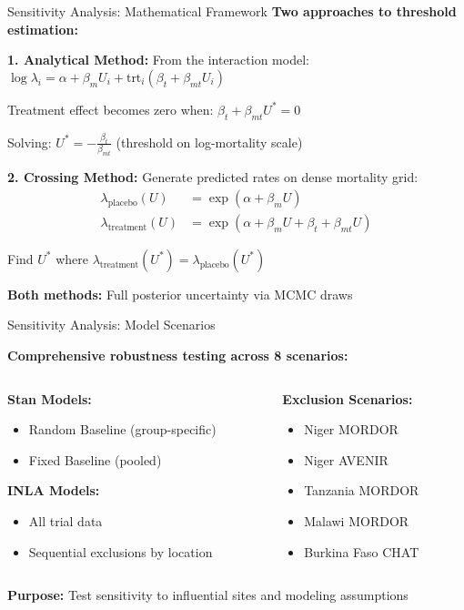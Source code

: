 \documentclass[aspectratio=169]{beamer}\usepackage[]{graphicx}\usepackage[dvipsnames]{xcolor}
\begin{document}
\begin{frame}{Sensitivity Analysis: Mathematical Framework}
\textbf{Two approaches to threshold estimation:}

\vspace{0.3cm}
\textbf{1. Analytical Method:}
From the interaction model: $\log \lambda_i = \alpha + \beta_m U_i + \text{trt}_i(\beta_t + \beta_{mt} U_i)$

Treatment effect becomes zero when: $\beta_t + \beta_{mt} U^* = 0$

Solving: $U^* = -\frac{\beta_t}{\beta_{mt}}$ (threshold on log-mortality scale)

\vspace{0.3cm}
\textbf{2. Crossing Method:}
Generate predicted rates on dense mortality grid:
\begin{align*}
\lambda_{\text{placebo}}(U) &= \exp(\alpha + \beta_m U) \\
\lambda_{\text{treatment}}(U) &= \exp(\alpha + \beta_m U + \beta_t + \beta_{mt} U)
\end{align*}

Find $U^*$ where $\lambda_{\text{treatment}}(U^*) = \lambda_{\text{placebo}}(U^*)$

\vspace{0.3cm}
\textbf{Both methods:} Full posterior uncertainty via MCMC draws
\end{frame}

\begin{frame}{Sensitivity Analysis: Model Scenarios}


\textbf{Comprehensive robustness testing across 8 scenarios:}

\begin{columns}
\begin{column}{0.5\textwidth}
\textbf{Stan Models:}
\begin{itemize}
  \item Random Baseline (group-specific)
  \item Fixed Baseline (pooled)
\end{itemize}

\textbf{INLA Models:}
\begin{itemize}
  \item All trial data
  \item Sequential exclusions by location
\end{itemize}
\end{column}
\begin{column}{0.5\textwidth}
\textbf{Exclusion Scenarios:}
\begin{itemize}
  \item Niger MORDOR
  \item Niger AVENIR  
  \item Tanzania MORDOR
  \item Malawi MORDOR
  \item Burkina Faso CHAT
\end{itemize}
\end{column}
\end{columns}

\vspace{0.3cm}
\textbf{Purpose:} Test sensitivity to influential sites and modeling assumptions
\end{frame}
\end{document}
